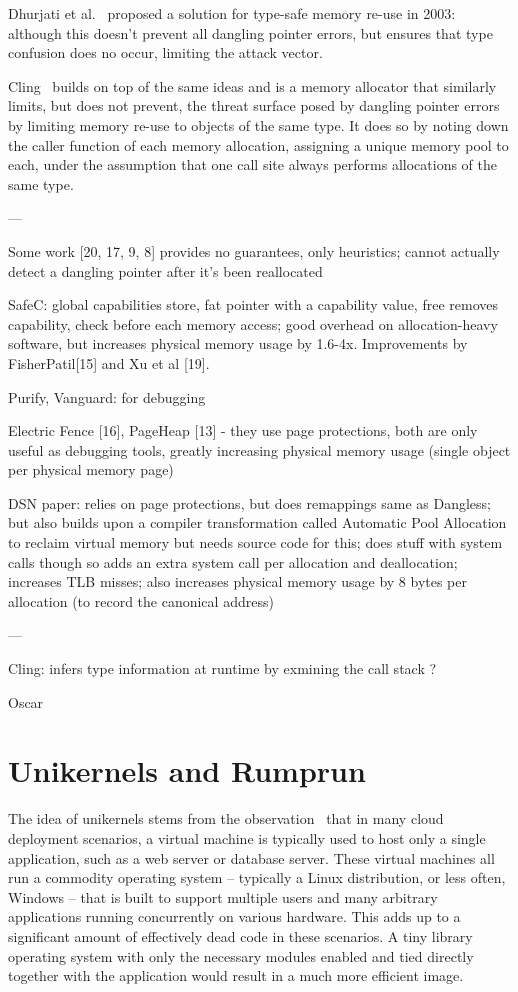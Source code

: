 Dhurjati et al.~\cite{dhurjati2003memory} proposed a solution for type-safe memory re-use in 2003: although this doesn't prevent all dangling pointer errors, but ensures that type confusion does no occur, limiting the attack vector.

Cling~\cite{akritidis2010cling} builds on top of the same ideas and is a memory allocator that similarly limits, but does not prevent, the threat surface posed by dangling pointer errors by limiting memory re-use to objects of the same type. It does so by noting down the caller function of each memory allocation, assigning a unique memory pool to each, under the assumption that one call site always performs allocations of the same type.

---

\cite{dhurjati2006efficiently}

Some work [20, 17, 9, 8] provides no guarantees, only heuristics; cannot actually detect a dangling pointer after it's been reallocated

SafeC: global capabilities store, fat pointer with a capability value, free removes capability, check before each memory access; good overhead on allocation-heavy software, but increases physical memory usage by 1.6-4x. Improvements by FisherPatil[15] and Xu et al [19].

Purify, Vanguard: for debugging

Electric Fence [16], PageHeap [13]
 - they use page protections, both are only useful as debugging tools, greatly increasing physical memory usage (single object per physical memory page)

DSN paper: relies on page protections, but does remappings same as Dangless; but also builds upon a compiler transformation called Automatic Pool Allocation to reclaim virtual memory but needs source code for this; does stuff with system calls though so adds an extra system call per allocation and deallocation; increases TLB misses; also increases physical memory usage by 8 bytes per allocation (to record the canonical address)

---

Cling: infers type information at runtime by exmining the call stack ?

Oscar

\section{Unikernels and Rumprun}

The idea of unikernels stems from the observation~\cite{unikernels-intro} that in many cloud deployment scenarios, a virtual machine is typically used to host only a single application, such as a web server or database server. These virtual machines all run a commodity operating system -- typically a Linux distribution, or less often, Windows -- that is built to support multiple users and many arbitrary applications running concurrently on various hardware. This adds up to a significant amount of effectively dead code in these scenarios.
A tiny library operating system with only the necessary modules enabled and tied directly together with the application would result in a much more efficient image.

